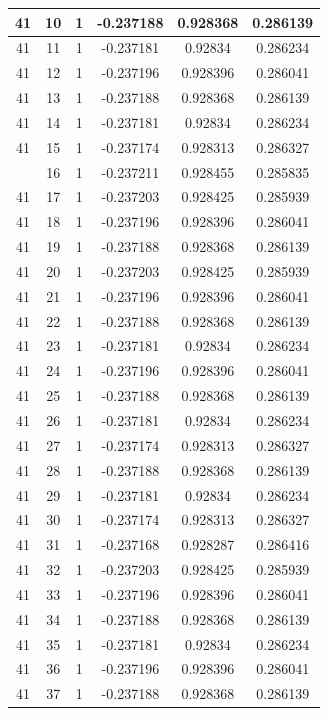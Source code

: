\documentclass[12pt,a4paper]{article}
\numberwithin{equation}{section}
\numberwithin{figure}{section}
\numberwithin{table}{section}
\begin{document}
\begin{longtable}{|c|c|c|c|c|c|}
41 & 10 & 1 & -0.237188 & 0.928368 & 0.286139 \\ \hline
41 & 11 & 1 & -0.237181 & 0.92834 & 0.286234 \\ \hline
41 & 12 & 1 & -0.237196 & 0.928396 & 0.286041 \\ \hline
41 & 13 & 1 & -0.237188 & 0.928368 & 0.286139 \\ \hline
41 & 14 & 1 & -0.237181 & 0.92834 & 0.286234 \\ \hline
41 & 15 & 1 & -0.237174 & 0.928313 & 0.286327 \\ \hline
\pagebreak
41 & 16 & 1 & -0.237211 & 0.928455 & 0.285835 \\ \hline
41 & 17 & 1 & -0.237203 & 0.928425 & 0.285939 \\ \hline
41 & 18 & 1 & -0.237196 & 0.928396 & 0.286041 \\ \hline
41 & 19 & 1 & -0.237188 & 0.928368 & 0.286139 \\ \hline
41 & 20 & 1 & -0.237203 & 0.928425 & 0.285939 \\ \hline
41 & 21 & 1 & -0.237196 & 0.928396 & 0.286041 \\ \hline
41 & 22 & 1 & -0.237188 & 0.928368 & 0.286139 \\ \hline
41 & 23 & 1 & -0.237181 & 0.92834 & 0.286234 \\ \hline
41 & 24 & 1 & -0.237196 & 0.928396 & 0.286041 \\ \hline
41 & 25 & 1 & -0.237188 & 0.928368 & 0.286139 \\ \hline
41 & 26 & 1 & -0.237181 & 0.92834 & 0.286234 \\ \hline
41 & 27 & 1 & -0.237174 & 0.928313 & 0.286327 \\ \hline
41 & 28 & 1 & -0.237188 & 0.928368 & 0.286139 \\ \hline
41 & 29 & 1 & -0.237181 & 0.92834 & 0.286234 \\ \hline
41 & 30 & 1 & -0.237174 & 0.928313 & 0.286327 \\ \hline
41 & 31 & 1 & -0.237168 & 0.928287 & 0.286416 \\ \hline
41 & 32 & 1 & -0.237203 & 0.928425 & 0.285939 \\ \hline
41 & 33 & 1 & -0.237196 & 0.928396 & 0.286041 \\ \hline
41 & 34 & 1 & -0.237188 & 0.928368 & 0.286139 \\ \hline
41 & 35 & 1 & -0.237181 & 0.92834 & 0.286234 \\ \hline
41 & 36 & 1 & -0.237196 & 0.928396 & 0.286041 \\ \hline
41 & 37 & 1 & -0.237188 & 0.928368 & 0.286139 \\ \hline

\end{longtable}
\end{document}
